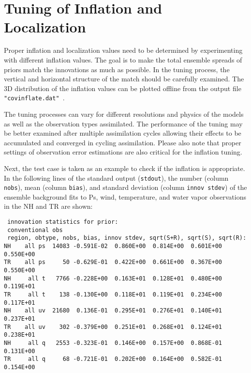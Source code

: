 \section{Tuning of Inflation and Localization} \label{ch4_tuningandinflat}

Proper inflation and localization values need to be determined by experimenting with different inflation values. The goal is to make the total ensemble spreads of priors match the innovations as much as possible. In the tuning process, the vertical and horizontal structure of the match should be carefully examined. The 3D distribution of the inflation values can be plotted offline from the output file \verb| "covinflate.dat" |.

The tuning processes can vary for different resolutions and physics of the models as well as the observation types assimilated. The performance of the tuning may be better examined after multiple assimilation cycles allowing their effects to be accumulated and converged in cycling assimilation. Please also note that proper settings of observation error estimations are also critical for the inflation tuning.

Next, the test case is taken as an example to check if the inflation is appropriate. In the following lines of the standard output (\verb|stdout|), the number (column \verb|nobs|), mean (column \verb|bias|), and standard deviation (column \verb|innov stdev|) of the ensemble background fits to Ps, wind, temperature, and water vapor observations in the NH and TR are shown:
\begin{scriptsize}
\begin{verbatim}
 innovation statistics for prior:
 conventional obs
 region, obtype, nobs, bias, innov stdev, sqrt(S+R), sqrt(S), sqrt(R):
NH    all ps  14083 -0.591E-02  0.860E+00  0.814E+00  0.601E+00  0.550E+00
TR    all ps     50 -0.629E-01  0.422E+00  0.661E+00  0.367E+00  0.550E+00
NH     all t   7766 -0.228E+00  0.163E+01  0.128E+01  0.480E+00  0.119E+01
TR     all t    138 -0.130E+00  0.118E+01  0.119E+01  0.234E+00  0.117E+01
NH    all uv  21680  0.136E-01  0.295E+01  0.276E+01  0.140E+01  0.237E+01
TR    all uv    302 -0.379E+00  0.251E+01  0.268E+01  0.124E+01  0.238E+01
NH     all q   2553 -0.323E-01  0.146E+00  0.157E+00  0.868E-01  0.131E+00
TR     all q     68 -0.721E-01  0.202E+00  0.164E+00  0.582E-01  0.154E+00
\end{verbatim}
\end{scriptsize}

